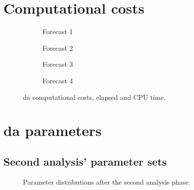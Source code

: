 \documentclass[12pt,twoside]{report}
\begin{document}
\clearpage

\chapter{Computational costs} \label{app:comp_costs}
\begin{figure}[h!]
\begin{subfigure}{.475\linewidth}
  
  \caption{Forecast 1}
  \label{}
\end{subfigure}\hfill %
\begin{subfigure}{.475\linewidth}
  
  \caption{Forecast 2}
  \label{}
\end{subfigure}

\medskip %

\begin{subfigure}{.475\linewidth}
  
  \caption{Forecast 3}
  \label{}
\end{subfigure}\hfill %
\begin{subfigure}{.475\linewidth}
  
  \caption{Forecast 4}
  \label{}
\end{subfigure}

\caption{\gls{da} computational costs, elapsed and CPU time.}
\label{fig:}
\end{figure}

\clearpage


\chapter{\gls{da} parameters}
\minitoc

\clearpage

\section{Second analysis' parameter sets}

\begin{figure}[h!]
    \centering
    
    \caption{Parameter distributions after the second analysis phase.}
    \label{fig:Forecast2_parameters_noInflation}
\end{figure}
\end{document}
